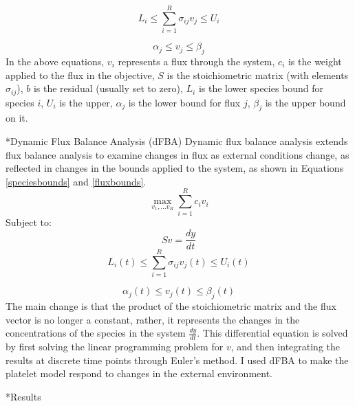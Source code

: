 \documentclass[11pt]{article}
\makeatletter
\renewcommand\subsection{\@startsection
	{subsection}{2}{0mm}
	{-0.05in}
	{-0.5\baselineskip}
	{\normalfont\normalsize\bfseries}}
\renewcommand\section{\@startsection
	{subsection}{2}{0mm}
	{-0.2in}
	{0.05\baselineskip}
	{\normalfont\large\bfseries}}
\makeatother
\begin{document}
\begin{equation}
L_i  \leq \sum_{i=1}^R \sigma_{ij}v_j \leq U_i
\end{equation}

\begin{equation}
\alpha_j \leq v_j \leq \beta_j
\end{equation}
In the above equations, $v_i$ represents a flux through the system, $c_i$ is the weight applied to the flux in the objective, $S$ is the stoichiometric matrix (with elements $\sigma_{ij}$), $b$ is the residual (usually set to zero), $L_i$ is the lower species bound for species $i$, $U_i$ is the upper, $\alpha_j$ is the lower bound for flux $j$, $\beta_j$ is the upper bound on it.
\subsection*{Dynamic Flux Balance Analysis (dFBA)}
Dynamic flux balance analysis extends flux balance analysis to examine changes in flux as external conditions change, as reflected in changes in the bounds applied to the system, as shown in Equations \ref{speciesbounds} and \ref{fluxbounds}.  
\begin{equation}
\max_{v_1,...v_R}\sum_{i=1}^Rc_iv_i
\end{equation}
Subject to:
\begin{equation}
Sv=\frac{dy}{dt}
\end{equation}
\begin{equation}
\label{speciesbounds}
L_i(t)  \leq \sum_{i=1}^R \sigma_{ij}v_j(t) \leq U_i(t)
\end{equation}

\begin{equation}
\label{fluxbounds}
\alpha_j(t) \leq v_j(t) \leq \beta_j(t)
\end{equation}
The main change is that the product of the stoichiometric matrix and the flux vector is no longer a constant, rather, it represents the changes in the concentrations of the species in the system $\frac{dy}{dt}$. This differential equation is solved by first solving the linear programming problem for $v$, and then integrating the results at discrete time points through Euler's method. I used dFBA to make the platelet model respond to changes in the external environment.
\section*{Results}

\clearpage


\end{document}
